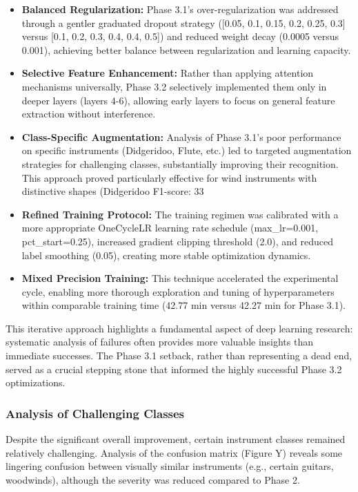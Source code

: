 \begin{itemize}
    \item \textbf{Balanced Regularization:} Phase 3.1's over-regularization was addressed through a gentler graduated dropout strategy ([0.05, 0.1, 0.15, 0.2, 0.25, 0.3] versus [0.1, 0.2, 0.3, 0.4, 0.4, 0.5]) and reduced weight decay (0.0005 versus 0.001), achieving better balance between regularization and learning capacity.
    
    \item \textbf{Selective Feature Enhancement:} Rather than applying attention mechanisms universally, Phase 3.2 selectively implemented them only in deeper layers (layers 4-6), allowing early layers to focus on general feature extraction without interference.
    
    \item \textbf{Class-Specific Augmentation:} Analysis of Phase 3.1's poor performance on specific instruments (Didgeridoo, Flute, etc.) led to targeted augmentation strategies for challenging classes, substantially improving their recognition. This approach proved particularly effective for wind instruments with distinctive shapes (Didgeridoo F1-score: 33%
    
    \item \textbf{Refined Training Protocol:} The training regimen was calibrated with a more appropriate OneCycleLR learning rate schedule (max\_lr=0.001, pct\_start=0.25), increased gradient clipping threshold (2.0), and reduced label smoothing (0.05), creating more stable optimization dynamics.
    
    \item \textbf{Mixed Precision Training:} This technique accelerated the experimental cycle, enabling more thorough exploration and tuning of hyperparameters within comparable training time (42.77 min versus 42.27 min for Phase 3.1).
\end{itemize}

This iterative approach highlights a fundamental aspect of deep learning research: systematic analysis of failures often provides more valuable insights than immediate successes. The Phase 3.1 setback, rather than representing a dead end, served as a crucial stepping stone that informed the highly successful Phase 3.2 optimizations.


\subsubsection{Analysis of Challenging Classes}
Despite the significant overall improvement, certain instrument classes remained relatively challenging. Analysis of the confusion matrix (Figure Y) reveals some lingering confusion between visually similar instruments (e.g., certain guitars, woodwinds), although the severity was reduced compared to Phase 2.

